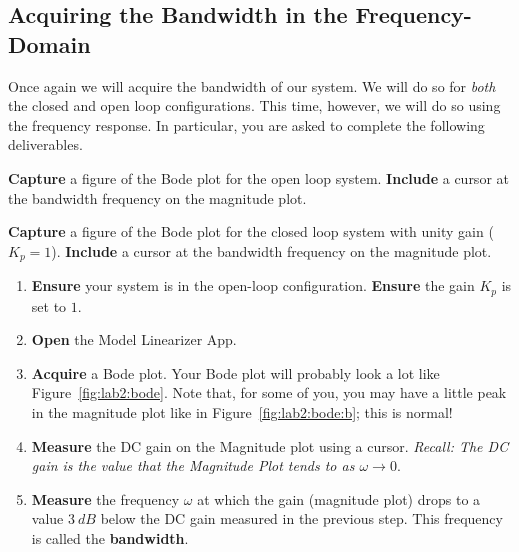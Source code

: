 \subsection{Acquiring the Bandwidth in the Frequency-Domain}
Once again we will acquire the bandwidth of our system. We will do so for
\emph{both} the closed and open loop configurations. This time, however,
we will do so using the frequency response. In particular, you are asked
to complete the following deliverables.
%
\begin{deliverable}[label={lab2:d3a}]
  \textbf{Capture} a figure of the Bode plot for the open loop system.
  \textbf{Include} a cursor at the bandwidth frequency on the magnitude
  plot.
\end{deliverable}
%
\begin{deliverable}[label={lab2:d3}]
  \textbf{Capture} a figure of the Bode plot for the closed loop system
  with unity gain (\(K_p = 1\)).
  \textbf{Include} a cursor at the bandwidth frequency on the magnitude
  plot.
\end{deliverable}
%
\begin{procedure}[label={proc:lab2:p3}]
  \begin{enumerate}[label=(\arabic*)]
    \item{
      \textbf{Ensure} your system is in the open-loop configuration.
      \textbf{Ensure} the gain \(K_p\) is set to \(1.\)
    }
    \item{
      \textbf{Open} the Model Linearizer App.
    }
    \item{
      \textbf{Acquire} a Bode plot. Your Bode plot will probably look a lot
      like Figure~\ref{fig:lab2:bode}. Note that, for some of you, you may
      have a little peak in the magnitude plot like in
      Figure~\ref{fig:lab2:bode:b}; this is normal!
    }
    \item{
      \textbf{Measure} the DC gain on the Magnitude plot using a cursor.
      \emph{Recall: The DC gain is the value that the Magnitude Plot tends to
      as \(\omega \to 0.\)}
    }
    \item{
      \textbf{Measure} the frequency \(\omega\) at which the gain
      (magnitude plot) drops to a value \(\SI{3}{dB}\)
      below the DC gain measured in the previous step. This frequency
      is called the \textbf{bandwidth}.
    }
  \end{enumerate}
\end{procedure}
%
